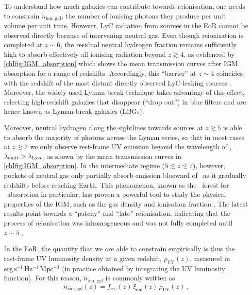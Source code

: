 To understand how much galaxies can contribute towards reionisation, one needs to constrain $\dot{n}_\text{ion, gal}$, the number of ionising photons they produce per unit volume per unit time. However, LyC radiation from sources in the EoR cannot be observed directly because of intervening neutral gas. Even though reionisation is completed at $z \sim 6$, the residual neutral hydrogen fraction remains sufficiently high to absorb effectively all ionising radiation beyond $z \gtrsim 4$, as evidenced by \cref{chIfig:IGM_absorption} which shows the mean transmission curves after IGM absorption for a range of redshifts. Accordingly, this ``barrier'' at $z \sim 4$ coincides with the redshift of the most distant directly observed LyC-leaking sources \citep[e.g.][]{2018MNRAS.476L..15V}. Moreover, the widely used Lyman-break technique takes advantage of this effect, selecting high-redshift galaxies that disappear (``drop out'') in blue filters and are hence known as Lyman-break galaxies (LBGs).

Moreover, neutral hydrogen along the sightlines towards sources at $z \gtrsim 5$ is able to absorb the majority of photons across the Lyman series, so that in most cases at $z \gtrsim 7$ we only observe rest-frame UV emission beyond the wavelength of \lya, $\lambda_\text{emit} > \lambda_\text{{Ly\ensuremath{\upalpha}}}$, as shown by the mean transmission curves in \cref{chIfig:IGM_absorption}. In the intermediate regime ($5 \lesssim z \lesssim 7$), however, pockets of neutral gas only partially absorb emission blueward of \lya\ as it gradually redshifts before reaching Earth. This phenomenon, known as the \lya\ forest for \lya\ absorption in particular, has proven a powerful tool to study the physical properties of the IGM, such as the gas density and ionisation fraction \citep{1965ApJ...142.1633G}. The latest results point towards a ``patchy'' and ``late'' reionisation, indicating that the process of reionisation was inhomogeneous \citep[e.g.][]{2020MNRAS.491.1736K} and was not fully completed until $z \sim 5$ \citep[instead of the colloquial value of $z \sim 6$ that is often assumed;][]{2022MNRAS.514...55B}.

In the EoR, the quantity that we are able to constrain empirically is thus the rest-frame UV luminosity density at a given redshift, $\rho_\text{UV} (z)$, measured in $\mathrm{erg \, s^{-1} \, Hz^{-1} \, Mpc^{-3}}$ (in practice obtained by integrating the UV luminosity function). For this reason, $\dot{n}_\text{ion, gal}$ is commonly written as
\begin{equation}
    \label{chIeq:Reionisation_budget}
    \dot{n}_\text{ion, gal} (z) = f_\text{esc} (z) \, \xi_\text{ion} (z) \, \rho_\text{UV} (z) \, ,
\end{equation}

